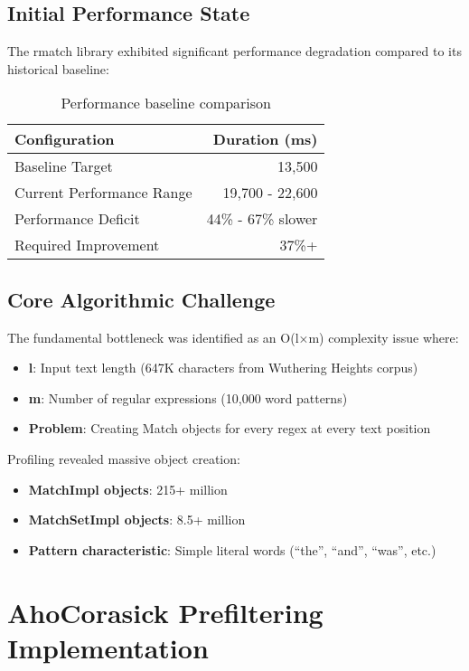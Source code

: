 \documentclass[11pt,a4paper]{article}
\begin{document}
\subsection{Initial Performance State}

The rmatch library exhibited significant performance degradation compared to its historical baseline:

\begin{table}[h]
\centering
\begin{tabular}{lr}
\toprule
Configuration & Duration (ms) \\
\midrule
Baseline Target & 13,500 \\
Current Performance Range & 19,700 - 22,600 \\
Performance Deficit & 44\% - 67\% slower \\
Required Improvement & 37\%+ \\
\bottomrule
\end{tabular}
\caption{Performance baseline comparison}
\end{table}

\subsection{Core Algorithmic Challenge}

The fundamental bottleneck was identified as an O(l×m) complexity issue where:
\begin{itemize}
\item \textbf{l}: Input text length (647K characters from Wuthering Heights corpus)
\item \textbf{m}: Number of regular expressions (10,000 word patterns)
\item \textbf{Problem}: Creating Match objects for every regex at every text position
\end{itemize}

Profiling revealed massive object creation:
\begin{itemize}
\item \textbf{MatchImpl objects}: 215+ million
\item \textbf{MatchSetImpl objects}: 8.5+ million  
\item \textbf{Pattern characteristic}: Simple literal words (``the'', ``and'', ``was'', etc.)
\end{itemize}

\section{AhoCorasick Prefiltering Implementation}
\end{document}
